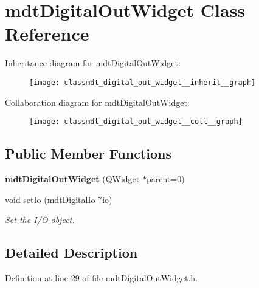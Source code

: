 \hypertarget{classmdt_digital_out_widget}{
\section{mdtDigitalOutWidget Class Reference}
\label{classmdt_digital_out_widget}
}


Inheritance diagram for mdtDigitalOutWidget:\nopagebreak
\begin{figure}[H]
\begin{center}
\leavevmode
\texttt{[image: classmdt\_digital\_out\_widget\_\_inherit\_\_graph]}
\end{center}
\end{figure}


Collaboration diagram for mdtDigitalOutWidget:\nopagebreak
\begin{figure}[H]
\begin{center}
\leavevmode
\texttt{[image: classmdt\_digital\_out\_widget\_\_coll\_\_graph]}
\end{center}
\end{figure}
\subsection*{Public Member Functions}
\begin{DoxyCompactItemize}
\item 
\hypertarget{classmdt_digital_out_widget_a71a1e8b0eb39b51bce4d3df49293fb89}{
{\bfseries mdtDigitalOutWidget} (QWidget $\ast$parent=0)}
\label{classmdt_digital_out_widget_a71a1e8b0eb39b51bce4d3df49293fb89}

\item 
void \hyperlink{classmdt_digital_out_widget_a3c6f8df089e3a2527d43d1f0a1fad61c}{setIo} (\hyperlink{classmdt_digital_io}{mdtDigitalIo} $\ast$io)
\begin{DoxyCompactList}\small\item\em Set the I/O object. \end{DoxyCompactList}\end{DoxyCompactItemize}


\subsection{Detailed Description}


Definition at line 29 of file mdtDigitalOutWidget.h.




